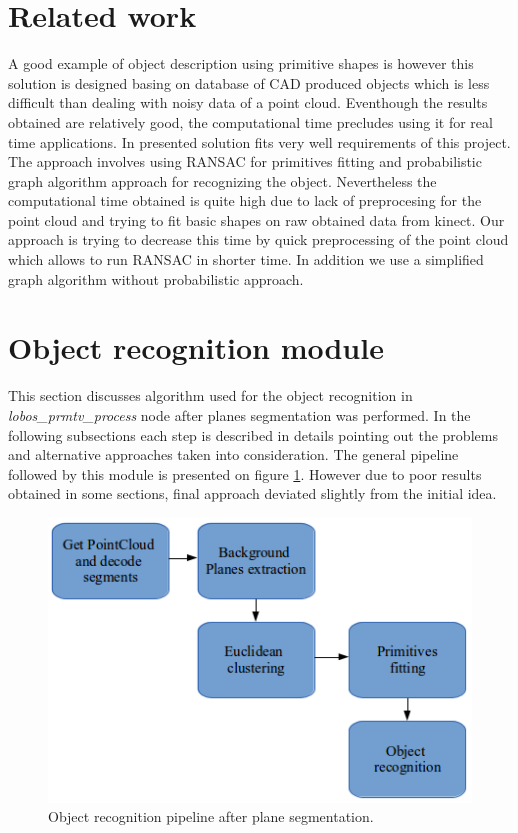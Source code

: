 \documentclass[12pt,oneside]{amsart}
\title{}
\author{}
\begin{document}
\maketitle
\section{Related work}
A good example of object description using primitive shapes is \cite{pap2} however this solution is designed basing on database of CAD produced objects which is less difficult than dealing with noisy data of a point cloud. Eventhough the results obtained are relatively good, the computational time precludes using it for real time applications. In \cite{pap1} presented solution fits very well requirements of this project. The approach involves using RANSAC for primitives fitting and probabilistic graph algorithm approach for recognizing the object. Nevertheless the computational time obtained is quite high due to lack of preprocesing for the point cloud and trying to fit basic shapes on raw obtained data from kinect. Our approach is trying to decrease this time by quick preprocessing of the point cloud which allows to run RANSAC in shorter time. In addition we use a simplified graph algorithm without probabilistic approach.

\section{Object recognition module}
This section discusses algorithm used for the object recognition in \emph{lobos\_prmtv\_process} node after planes segmentation was performed. In the following subsections each step is described in details pointing out the problems and alternative approaches taken into consideration. The general pipeline followed by this module is presented on figure \ref{fig:pipeline}. However due to poor results obtained in some sections, final approach deviated slightly from the initial idea.


\begin{figure}
  \includegraphics[scale=0.7]{images/pipeline}
  \caption{Object recognition pipeline after plane segmentation.}
  \label{fig:pipeline}
\end{figure}
\end{document}
